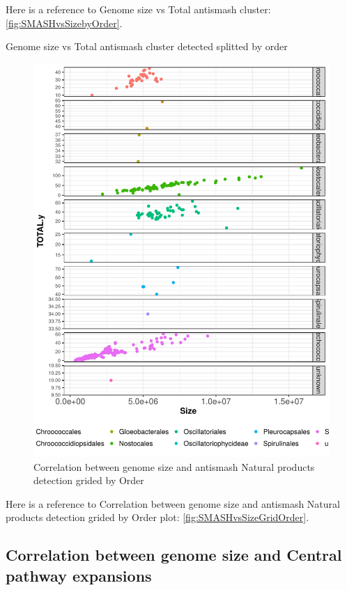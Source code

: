 \documentclass[12pt,twoside]{reedthesis}
\begin{document}
  Here is a reference to Genome size vs Total antismash cluster:
  \autoref{fig:SMASHvsSizebyOrder}. \clearpage
  
  Genome size vs Total antismash cluster detected splitted by order
  
  \begin{figure}[h!tbp]
  \centering
  \includegraphics[angle = 0,scale = 0.6]{chapter2/Cyanobacteria/SMASHvsSizeGridOrder.pdf}
  \caption[Correlation between genome size and antismash Natural products detection grided by Order]{\normalsize{Correlation between genome size and antismash Natural products detection grided by Order}}
  \label{fig:SMASHvsSizeGridOrder}
  \end{figure}
  
  Here is a reference to Correlation between genome size and antismash
  Natural products detection grided by Order plot:
  \autoref{fig:SMASHvsSizeGridOrder}. \clearpage 
  
  \subsection{Correlation between genome size and Central pathway
  expansions}\label{correlation-between-genome-size-and-central-pathway-expansions-2}
  
\end{document}
